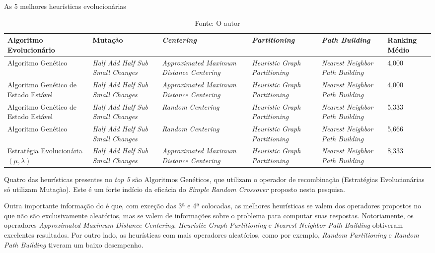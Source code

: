 \begin{table}
	\centering
	\caption{As 5 melhores heurísticas evolucionárias}
	\label{top5}
	\begin{tabularx}{\linewidth}{|X|X|X|X|X|X|}
		\hline
		\textbf{Algoritmo Evolucionário} & \textbf{Mutação} & \textbf{\textit{Centering}} & \textbf{\textit{Partitioning}} & \textbf{\textit{Path Building}} & \textbf{Ranking Médio} \\
		\hline
		Algoritmo Genético & \textit{Half Add Half Sub Small Changes} & \textit{Approximated Maximum Distance Centering} & \textit{Heuristic Graph Partitioning} & \textit{Nearest Neighbor Path Building} &  4,000\\
		\hline
		Algoritmo Genético de Estado Estável & \textit{Half Add Half Sub Small Changes} & \textit{Approximated Maximum Distance Centering} & \textit{Heuristic Graph Partitioning} & \textit{Nearest Neighbor Path Building} & 4,000\\
		\hline
		Algoritmo Genético de Estado Estável & \textit{Half Add Half Sub Small Changes} & \textit{Random Centering} & \textit{Heuristic Graph Partitioning} & \textit{Nearest Neighbor Path Building} & 5,333\\
		\hline
		Algoritmo Genético & \textit{Half Add Half Sub Small Changes} & \textit{Random Centering} & \textit{Heuristic Graph Partitioning} & \textit{Nearest Neighbor Path Building} & 5,666\\
		\hline
		Estratégia Evolucionária $(\mu, \lambda)$ & \textit{Half Add Half Sub Small Changes} & \textit{Approximated Maximum Distance Centering} & \textit{Heuristic Graph Partitioning} & \textit{Nearest Neighbor Path Building} & 8,333\\
		\hline
	\end{tabularx}
	\caption*{Fonte: O autor}
\end{table}

Quatro das heurísticas presentes no \textit{top 5} são Algoritmos Genéticos, que 
utilizam o operador de recombinação (Estratégias Evolucionárias só utilizam 
Mutação). Este é um forte indício da eficácia do 
\textit{Simple Random Crossover} proposto nesta pesquisa.

Outra importante informação do  é que, com exceção das 3ª e 4ª 
colocadas, as melhores heurísticas se valem dos operadores propostos no 
 que não são exclusivamente aleatórios, mas se valem de 
informações sobre o problema para computar suas respostas. Notoriamente, os 
operadores \textit{Approximated Maximum Distance Centering}, 
\textit{Heuristic Graph Partitioning} e \textit{Nearest Neighbor Path Building} 
obtiveram excelentes resultados. Por outro lado, as heurísticas com mais 
operadores aleatórios, como por exemplo, \textit{Random Partitioning} e 
\textit{Random Path Building} tiveram um baixo desempenho.

